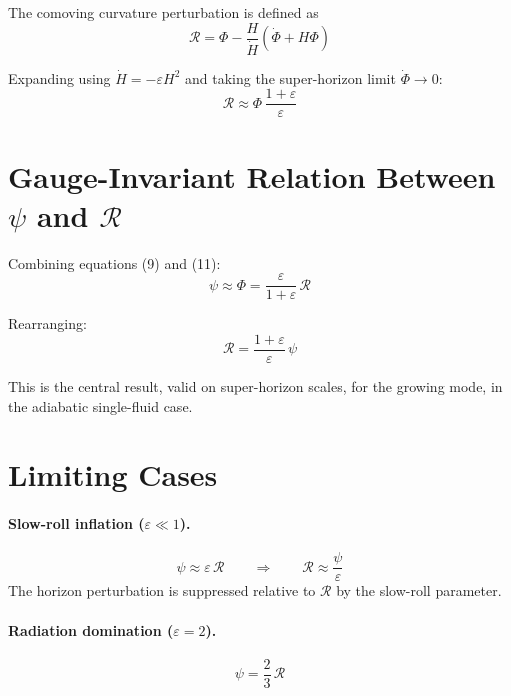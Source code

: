 \documentclass[12pt,a4paper]{article}
\begin{document}
The comoving curvature perturbation is defined as
\begin{equation}
\mathcal{R} = \Phi - \frac{H}{\dot{H}}\left(\dot{\Phi} + H\Phi\right) \tag{10}
\end{equation}

Expanding using $\dot{H} = -\varepsilon H^2$ and taking the super-horizon limit $\dot{\Phi} \to 0$:
\begin{equation}
\mathcal{R} \approx \Phi\,\frac{1 + \varepsilon}{\varepsilon} \tag{11}
\end{equation}

\section{Gauge-Invariant Relation Between $\psi$ and $\mathcal{R}$}

Combining equations (9) and (11):
\begin{equation}
\psi \approx \Phi = \frac{\varepsilon}{1+\varepsilon}\,\mathcal{R} \tag{12}
\end{equation}

Rearranging:
\begin{equation}
\mathcal{R} = \frac{1 + \varepsilon}{\varepsilon}\,\psi \tag{13}
\end{equation}

This is the central result, valid on super-horizon scales, for the growing mode, in the adiabatic single-fluid case.

\section{Limiting Cases}

\paragraph{Slow-roll inflation ($\varepsilon \ll 1$).}
\begin{equation}
\psi \approx \varepsilon\,\mathcal{R} \qquad \Longrightarrow \qquad \mathcal{R} \approx \frac{\psi}{\varepsilon} \tag{14}
\end{equation}
The horizon perturbation is suppressed relative to $\mathcal{R}$ by the slow-roll parameter.

\paragraph{Radiation domination ($\varepsilon = 2$).}
\begin{equation}
\psi = \frac{2}{3}\,\mathcal{R} \tag{15}
\end{equation}
\end{document}
